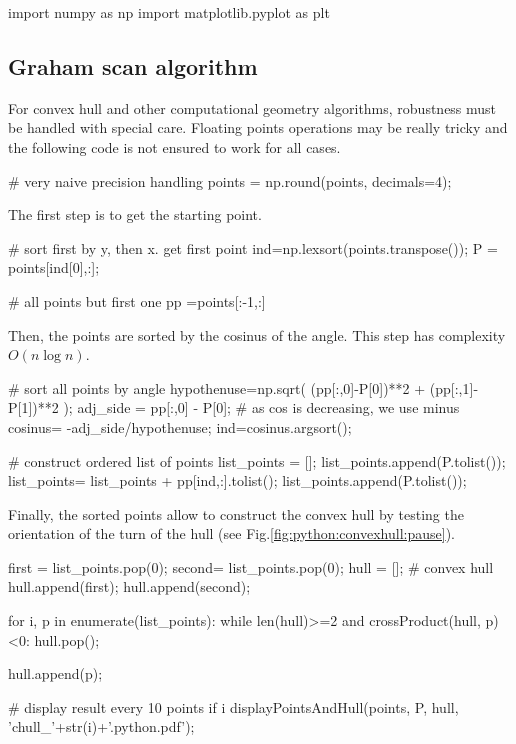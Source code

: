 \def\QRCODE{TB_IPR_TUT.IMG.convexhull_pythonqrcode.png}
\def\QRPAGE{http://www.iptutorials.science/tree/master/TB_IPR/TUT.IMG.convexhull/python}


\begin{python}
import numpy as np
import matplotlib.pyplot as plt
\end{python}


\subsection{Graham scan algorithm}
For convex hull and other computational geometry algorithms, robustness must be handled with special care. Floating points operations may be really tricky and the following code is not ensured to work for all cases.


\begin{python}
# very naive precision handling
points = np.round(points, decimals=4);
\end{python}

The first step is to get the starting point.
\begin{python}
# sort first by y, then x. get first point
ind=np.lexsort(points.transpose());
P = points[ind[0],:];    

# all points but first one
pp =points[:-1,:]
\end{python}

Then, the points are sorted by the cosinus of the angle. This step has complexity $O(n\log n)$.
\begin{python}
# sort all points by angle
hypothenuse=np.sqrt( (pp[:,0]-P[0])**2 + (pp[:,1]-P[1])**2 );
adj_side = pp[:,0] - P[0];
# as cos is decreasing, we use minus
cosinus= -adj_side/hypothenuse;
ind=cosinus.argsort(); 

# construct ordered list of points
list_points = [];
list_points.append(P.tolist());
list_points= list_points + pp[ind,:].tolist();
list_points.append(P.tolist());
\end{python}

Finally, the sorted points allow to construct the convex hull by testing the orientation of the turn of the hull (see Fig.\ref{fig:python:convexhull:pause}). 
\begin{python}
first = list_points.pop(0);
second= list_points.pop(0);
hull = []; # convex hull
hull.append(first);
hull.append(second);

for i, p in enumerate(list_points):
    while len(hull)>=2 and crossProduct(hull, p)<0: 
        hull.pop();
        
    hull.append(p);  
    
    # display result every 10 points
    if i%
        displayPointsAndHull(points, P, hull, 'chull_'+str(i)+'.python.pdf');

\end{python}

